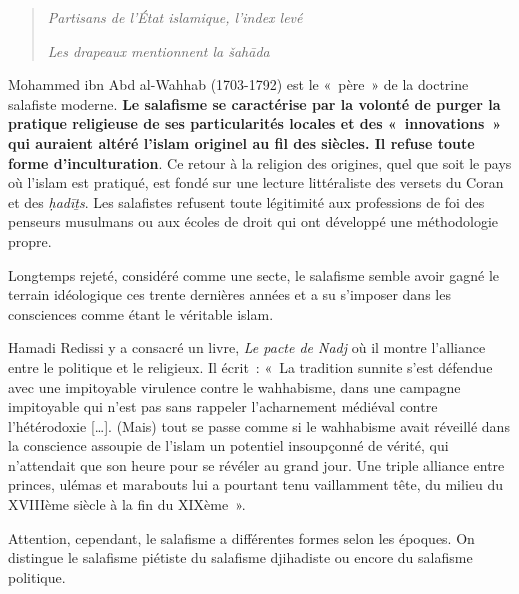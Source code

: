\begin{quote}
\emph{Partisans de l'État islamique, l'index levé}

\emph{Les drapeaux mentionnent la šahāda}
\end{quote}


Mohammed ibn Abd al-Wahhab (1703-1792) est le «~père~» de la doctrine
salafiste moderne. \textbf{Le salafisme se caractérise par la volonté de
purger la pratique religieuse de ses particularités locales et des
«~innovations~» qui auraient altéré l'islam originel au fil des
siècles}\textbf{. Il refuse toute forme d'inculturation}. Ce retour à la
religion des origines, quel que soit le pays où l'islam est pratiqué,
est fondé sur une lecture littéraliste des versets du Coran et des
\emph{ḥadīṯs}. Les salafistes refusent toute légitimité aux professions
de foi des penseurs musulmans ou aux écoles de droit qui ont développé
une méthodologie propre.

Longtemps rejeté, considéré comme une secte, le salafisme semble avoir
gagné le terrain idéologique ces trente dernières années et a su
s'imposer dans les consciences comme étant le véritable islam.

Hamadi Redissi y a consacré un livre, \emph{Le pacte de Nadj} où il
montre l'alliance entre le politique et le religieux. Il écrit~: «~La
tradition sunnite s'est défendue avec une impitoyable virulence contre
le wahhabisme, dans une campagne impitoyable qui n'est pas sans rappeler
l'acharnement médiéval contre l'hétérodoxie {[}\ldots{]}. (Mais) tout se
passe comme si le wahhabisme avait réveillé dans la conscience assoupie
de l'islam un potentiel insoupçonné de vérité, qui n'attendait que son
heure pour se révéler au grand jour. Une triple alliance entre princes,
ulémas et marabouts lui a pourtant tenu vaillamment tête, du milieu du
XVIIIème siècle à la fin du XIXème~».

Attention, cependant, le salafisme a différentes formes selon les
époques. On distingue le salafisme piétiste du salafisme djihadiste ou
encore du salafisme politique.


